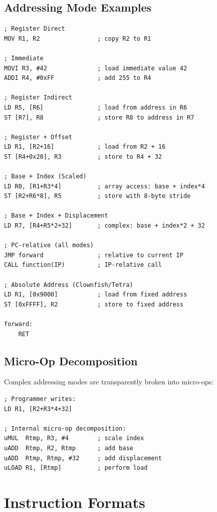 \documentclass[11pt]{article}
\begin{document}
\subsection{Addressing Mode Examples}

\begin{lstlisting}
; Register Direct
MOV R1, R2                ; copy R2 to R1

; Immediate
MOVI R3, #42              ; load immediate value 42
ADDI R4, #0xFF            ; add 255 to R4

; Register Indirect
LD R5, [R6]               ; load from address in R6
ST [R7], R8               ; store R8 to address in R7

; Register + Offset
LD R1, [R2+16]            ; load from R2 + 16
ST [R4+0x20], R3          ; store to R4 + 32

; Base + Index (Scaled)
LD R0, [R1+R3*4]          ; array access: base + index*4
ST [R2+R6*8], R5          ; store with 8-byte stride

; Base + Index + Displacement
LD R7, [R4+R5*2+32]       ; complex: base + index*2 + 32

; PC-relative (all modes)
JMP forward               ; relative to current IP
CALL function(IP)         ; IP-relative call

; Absolute Address (Clownfish/Tetra)
LD R1, [0x9000]           ; load from fixed address
ST [0xFFFF], R2           ; store to fixed address

forward:
    RET
\end{lstlisting}

\subsection{Micro-Op Decomposition}

Complex addressing modes are transparently broken into micro-ops:

\begin{lstlisting}
; Programmer writes:
LD R1, [R2+R3*4+32]

; Internal micro-op decomposition:
uMUL  Rtmp, R3, #4        ; scale index
uADD  Rtmp, R2, Rtmp      ; add base
uADD  Rtmp, Rtmp, #32     ; add displacement
uLOAD R1, [Rtmp]          ; perform load
\end{lstlisting}

\section{Instruction Formats}
\end{document}
